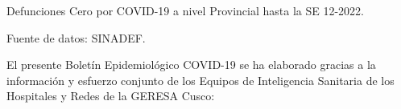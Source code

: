 \documentclass[12pt,a4paper,openany]{book}
\begin{document}
	\begin{table}[h]		\caption{Defunciones Cero por COVID-19 a nivel Provincial hasta la SE 12-2022.}
		\resizebox{\textwidth}{!}{%
			
		}
		{\footnotesize {Fuente de datos: SINADEF.}}
	\end{table}
\pagebreak

		
	\centering
		{\large El presente Boletín Epidemiológico COVID-19 se ha elaborado gracias a la información y esfuerzo conjunto de los Equipos de Inteligencia Sanitaria de los Hospitales y Redes de la GERESA Cusco:

}
\end{document}
